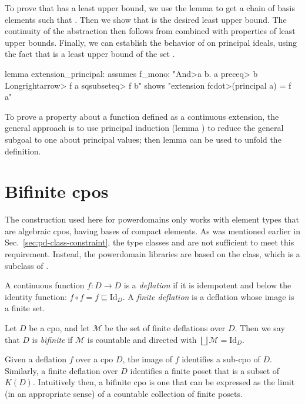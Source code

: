 To prove that  has a least upper bound, we use the lemma  to get a chain  of basis elements such that  . Then we show that  is the desired least upper bound. The continuity of the abstraction then follows from  combined with properties of least upper bounds. Finally, we can establish the behavior of  on principal ideals, using the fact that  is a least upper bound of the set .
%
\begin{isacode}
lemma extension_principal:
  assumes f_mono: "\<And>a b. a \<preceq> b \<Longrightarrow> f a \<sqsubseteq> f b"
  shows "extension f\<cdot>(principal a) = f a"
\end{isacode}
%
To prove a property about a function defined as a continuous extension, the general approach is to use principal induction (lemma ) to reduce the general subgoal to one about principal values; then lemma  can be used to unfold the definition.

\section{Bifinite cpos}
\label{sec:pd-bifinite}

The construction used here for powerdomains only works with element types that are algebraic cpos, having bases of compact elements. As was mentioned earlier in Sec.~\ref{sec:pd-class-constraint}, the type classes  and  are not sufficient to meet this requirement. Instead, the powerdomain libraries are based on the  class, which is a subclass of .
%
\begin{definition}
A continuous function $f : D \to D$ is a \emph{deflation} if it is idempotent and below the identity function: $f \circ f = f \sqsubseteq \mathrm{Id}_D$. A \emph{finite deflation} is a deflation whose image is a finite set.
\end{definition}
%
\begin{definition}
Let $D$ be a cpo, and let $\mathcal{M}$ be the set of finite deflations over $D$. Then we say that $D$ is \emph{bifinite} if $\mathcal{M}$ is countable and directed with $\bigsqcup \mathcal{M} = \mathrm{Id}_D$.
\end{definition}

Given a deflation $f$ over a cpo $D$, the image of $f$ identifies a sub-cpo of $D$. Similarly, a finite deflation over $D$ identifies a finite poset that is a subset of $K(D)$. Intuitively then, a bifinite cpo is one that can be expressed as the limit (in an appropriate sense) of a countable collection of finite posets.

